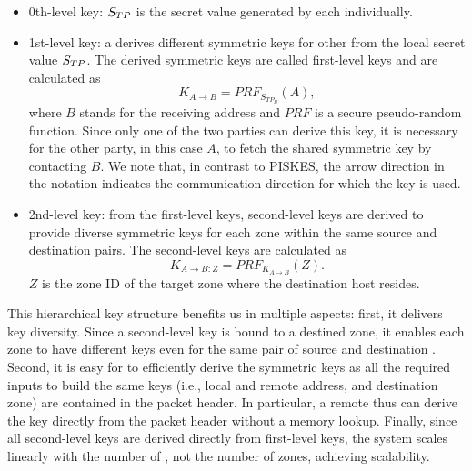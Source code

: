 \begin{itemize}
	\item 0th-level key: $S_{TP}$ is the secret value generated by each \tp individually.
	\item 1st-level key: a \tp derives different symmetric keys for other \tps from the
	local secret value $S_{TP}$. The derived symmetric keys are called first-level keys and 
	are calculated as
	\begin{equation}
		K_{A \rightarrow B} = PRF_{S_{{TP}_B}}(A),
		\label{eq:1stkey}
	\end{equation}
	where $B$ stands for the receiving \tp address and $PRF$ is a secure pseudo-random 
	function. Since only one of the two parties can derive this key, it is necessary for 
	the other party, in this case $A$, to fetch the shared symmetric key by contacting 
	$B$. We note that, in contrast to PISKES, the arrow direction
	in the notation indicates the communication direction for which the key is used.
	\item 2nd-level key: from the first-level keys, second-level keys are derived to
	provide diverse symmetric keys for each zone within the same source and destination 
	\tp pairs. The second-level keys are calculated as
	\begin{equation}
		K_{A \rightarrow B:Z} = PRF_{K_{A \rightarrow B}}(Z).
		\label{eq:2ndkey}
	\end{equation}
	$Z$ is the zone ID of the target zone where the destination host resides. 
\end{itemize}

This hierarchical key structure benefits us in multiple aspects: first, it delivers
key diversity. Since a second-level key is bound to a destined zone, it enables 
each zone to have different keys even for the same pair of source and destination \tps. 
Second, it is easy for \tps to efficiently derive the symmetric keys as all the
required inputs to build the same keys (i.e., local and remote \tp address, and 
destination zone) are contained in the packet header. In particular, a remote \tp 
thus can derive the key directly from the packet header without a memory lookup. 
Finally, since all second-level keys are derived directly from first-level keys, 
the system scales linearly with the number of \tps, not the number of zones, achieving scalability.

